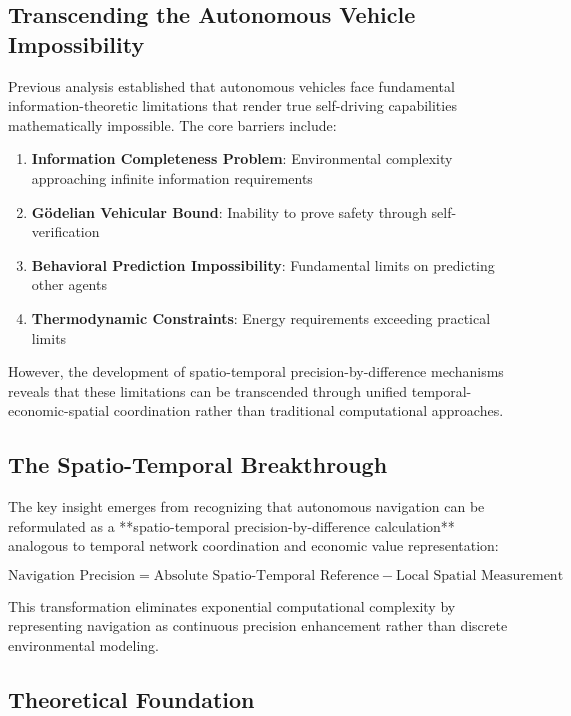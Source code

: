 \documentclass[12pt,a4paper]{article}
\begin{document}
\subsection{Transcending the Autonomous Vehicle Impossibility}

Previous analysis \citep{sachikonye2025autonomous} established that autonomous vehicles face fundamental information-theoretic limitations that render true self-driving capabilities mathematically impossible. The core barriers include:

\begin{enumerate}
\item \textbf{Information Completeness Problem}: Environmental complexity approaching infinite information requirements
\item \textbf{Gödelian Vehicular Bound}: Inability to prove safety through self-verification
\item \textbf{Behavioral Prediction Impossibility}: Fundamental limits on predicting other agents
\item \textbf{Thermodynamic Constraints}: Energy requirements exceeding practical limits
\end{enumerate}

However, the development of spatio-temporal precision-by-difference mechanisms \citep{sachikonye2025sango, sachikonye2025temporal} reveals that these limitations can be transcended through unified temporal-economic-spatial coordination rather than traditional computational approaches.

\subsection{The Spatio-Temporal Breakthrough}

The key insight emerges from recognizing that autonomous navigation can be reformulated as a **spatio-temporal precision-by-difference calculation** analogous to temporal network coordination and economic value representation:

\begin{equation}
\text{Navigation Precision} = \text{Absolute Spatio-Temporal Reference} - \text{Local Spatial Measurement}
\end{equation}

This transformation eliminates exponential computational complexity by representing navigation as continuous precision enhancement rather than discrete environmental modeling.

\subsection{Theoretical Foundation}
\end{document}
